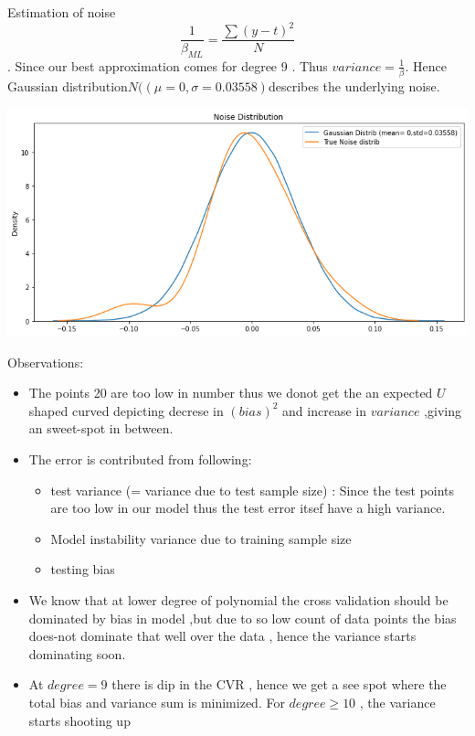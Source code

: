 \documentclass[11pt]{beamer}
\begin{document}
\begin{frame}
Estimation of noise 
$$\frac{1}{\beta_{ML}}= \frac{\sum{(y-t)^2}}{N}$$.
Since our best approximation comes for degree 9 . Thus $variance =\frac{1}{\beta}$. Hence Gaussian distribution$N((\mu= 0,\sigma=0.03558) $describes the underlying noise.

\includegraphics[scale=0.5]{images/27.png}
\end{frame}


\begin{frame}
Observations:
\begin{itemize}

\item The points 20 are too low in number thus we donot get the an expected $U$ shaped curved depicting decrese in $(bias)^2$ and increase in $variance$ ,giving an sweet-spot in between.
\item The error is contributed from following:
\begin{itemize}[]
    \item test variance (= variance due to test sample size) : Since the test points are too low in our model thus the test error itsef have a high variance.
    \item Model instability variance due to training sample size
    \item testing bias
\end{itemize}
	\item We know that  at lower degree of polynomial the cross validation should be dominated by bias in model ,but due to so low count of data points the bias does-not dominate that well over the data , hence the variance starts dominating soon.

\item At $degree =9$ there is  dip in the CVR , hence we get a see spot where the total bias and variance sum is minimized. 
For $degree\geq 10$ , the variance starts shooting up
\end{itemize}

\end{frame}
\end{document}
